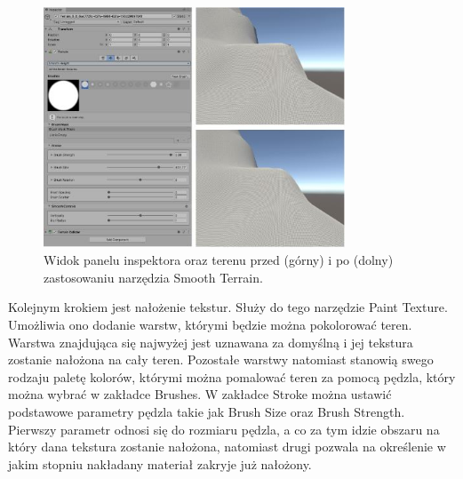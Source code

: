 \begin{figure}[h!]
    \centering
    \includegraphics[width=0.8\textwidth]{images/modelowanie_terenu/rzezbienie.jpg}
    \caption{Widok panelu inspektora oraz terenu przed (górny) i po (dolny) zastosowaniu narzędzia Smooth Terrain.}\label{fig:rzezbienie_terenu}
\end{figure}

Kolejnym krokiem jest nałożenie tekstur. Służy do tego narzędzie Paint Texture. Umożliwia ono dodanie warstw, którymi
będzie można pokolorować teren. Warstwa znajdująca się najwyżej jest uznawana za domyślną i jej tekstura zostanie
nałożona na cały teren. Pozostałe warstwy natomiast stanowią swego rodzaju paletę kolorów, którymi można pomalować teren
za pomocą pędzla, który można wybrać w zakładce Brushes. W zakładce Stroke można ustawić podstawowe parametry pędzla
takie jak Brush Size oraz Brush Strength. Pierwszy parametr odnosi się do rozmiaru pędzla, a co za tym idzie obszaru na
który dana tekstura zostanie nałożona, natomiast drugi pozwala na określenie w jakim stopniu nakładany materiał zakryje
już nałożony.


